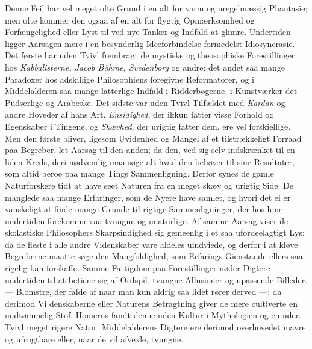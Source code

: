 \documentclass[12pt,a4paper]{article}
\newcommand{\opage}[1]{\marginnote{\footnotesize\textit{[#1]}}}
\begin{document}
Denne Feil har vel meget ofte Grund i en alt for varm og uregelmæssig Phantasie; men ofte
kommer den ogsaa af en alt for flygtig Opmærksomhed og Forfængelighed eller Lyst til ved
nye Tanker og Indfald at glimre. Undertiden ligger Aarsagen mere i en besynderlig
Ideeforbindelse formedelst Idiosyncrasie. Det første har uden Tvivl frembragt de mystiske
og theosophiske Forestillinger hos \emph{Kabbalisterne, Jacob Böhme, Svedenborg} og
andre: det andet saa mange Paradoxer hos adskillige Philosophiens foregivne Reformatorer,
og
\opage{153} i Middelalderen saa mange latterlige Indfald i Ridderbøgerne, i Kunstværker det Pudserlige
og Arabeske. Det sidste var uden Tvivl Tilfældet med \emph{Kardan} og andre Hoveder af
hans Art. \emph{Ensidighed}, der ikkun fatter visse Forhold og Egenskaber i Tingene, og
\emph{Skævhed}, der urigtig fatter dem, ere vel forskiellige. Men den første bliver,
ligesom Uvidenhed og Mangel af et tilstrækkeligt Forraad paa Begreber, let Aarsag til den
anden; da den, ved sig selv indskrænket til en liden Kreds, deri nødvendig maa søge alt
hvad den behøver til sine Resultater, som altid beroe paa mange Tings Sammenligning.
Derfor synes de gamle Naturforskere tidt at have seet Naturen fra en meget skæv og urigtig
Side. De manglede saa mange Erfaringer, som de Nyere have samlet, og hvori det ei er
vanskeligt at finde mange Grunde til rigtige Sammenligninger, der hos hine undertiden
forekomme saa tvungne og unaturlige. Af samme Aarsag viser de skolastiske Philosophers
Skarpsindighed sig gemeenlig i et saa ufordeelagtigt Lys; da de fleste i alle andre
Videnskaber vare aldeles uindviede, og derfor i at kløve Begreberne maatte søge den
Mangfoldighed, som Erfarings Gienstande ellers saa rigelig kan forskaffe. Samme Fattigdom
paa Forestillinger nøder Digtere undertiden til at betiene sig af Ordspil, tvungne
Allusioner og upassende Billeder. --- Blomstre, der falde af naar man kun aldrig saa lidet
rører derved ---; da derimod Vi%
\opage{154}denskaberne eller Naturens Betragtning giver de mere cultiverte en uudtømmelig Stof.
Homerus fandt denne uden Kultur i Mythologien og en uden Tvivl meget rigere Natur.
Middelalderens Digtere ere derimod overhovedet mavre og ufrugtbare eller, naar de vil
afvexle, tvungne.
\end{document}
